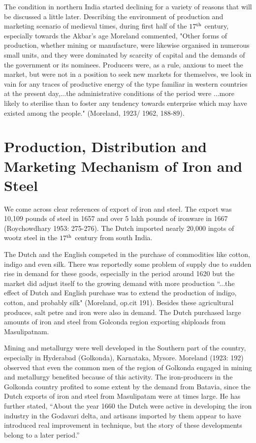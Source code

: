 The condition in northern India started declining for a variety of reasons that will be discussed a little later. Describing the environment of production and marketing scenario of medieval times, during first half of the $17^{\rm th}$ century, especially towards the Akbar's age Moreland commented, "Other forms of production, whether mining or manufacture, were likewise organised in numerous small units, and they were dominated by scarcity of capital and the demands of the government or its nominees. Producers were, as a rule, anxious to meet the market, but were not in a position to seek new markets for themselves, we look in vain for any traces of productive energy of the type familiar in western countries at the present day,...the administrative conditions of the period were ...more likely to sterilise than to foster any tendency towards enterprise which may have existed among the people." (Moreland, 1923/ 1962, 188-89).   

\section*{Production, Distribution and Marketing Mechanism of Iron and Steel}\label{section-3}

We come across clear references of export of iron and steel. The export was 10,109 pounds of steel in 1657 and over 5 lakh pounds of ironware in 1667 (Roychowdhary 1953: 275-276). The Dutch imported nearly 20,000 ingots of wootz steel in the $17^{\rm th}$ century from south India.

The Dutch and the English competed in the purchase of commodities like cotton, indigo and even silk. There was reportedly some problem of supply due to sudden rise in demand for these goods, especially in the period around 1620 but the market did adjust itself to the growing demand with more production “...the effect of Dutch and English purchase was to extend the production of indigo, cotton, and probably silk" (Moreland, op.cit 191). Besides these agricultural produces, salt petre and iron were also in demand. The Dutch purchased large amounts of iron and steel from Golconda region exporting shiploads from Masulipatnam.

Mining and metallurgy were well developed in the Southern part of the country, especially in Hyderabad (Golkonda), Karnataka, Mysore. Moreland (1923: 192) observed that even the common men of the region of Golkonda engaged in mining and metallurgy benefited because of this activity. The iron-producers in the Golkonda country profited to some extent by the demand from Batavia, since the Dutch exports of iron and steel from Masulipatam were at times large. He has further stated, “About the year 1660 the Dutch were active in developing the iron industry in the Godavari delta, and artisans imported by them appear to have introduced real improvement in technique, but the story of these developments belong to a later period.” 

